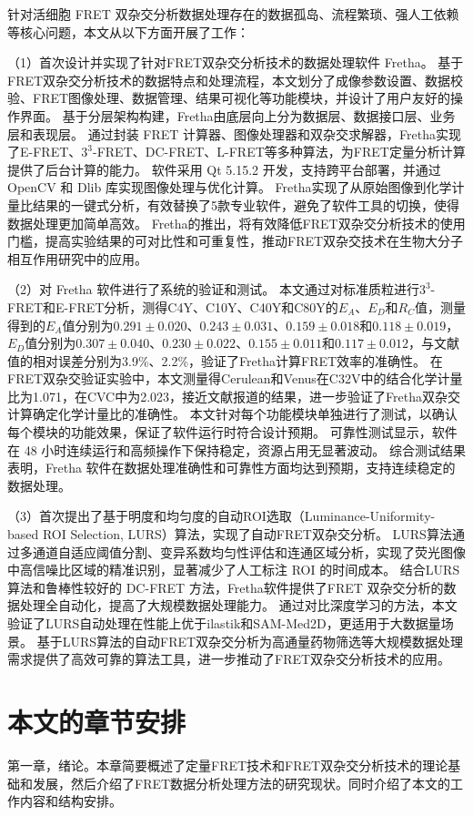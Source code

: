 针对活细胞 FRET 双杂交分析数据处理存在的数据孤岛、流程繁琐、强人工依赖等核心问题，本文从以下方面开展了工作：

（1）首次设计并实现了针对FRET双杂交分析技术的数据处理软件 Fretha。
基于FRET双杂交分析技术的数据特点和处理流程，本文划分了成像参数设置、数据校验、FRET图像处理、数据管理、结果可视化等功能模块，并设计了用户友好的操作界面。
基于分层架构构建，Fretha由底层向上分为数据层、数据接口层、业务层和表现层。
通过封装 FRET 计算器、图像处理器和双杂交求解器，Fretha实现了E-FRET、$3^3$-FRET、DC-FRET、L-FRET等多种算法，为FRET定量分析计算提供了后台计算的能力。
软件采用 Qt 5.15.2 开发，支持跨平台部署，并通过 OpenCV 和 Dlib 库实现图像处理与优化计算。
Fretha实现了从原始图像到化学计量比结果的一键式分析，有效替换了5款专业软件，避免了软件工具的切换，使得数据处理更加简单高效。
Fretha的推出，将有效降低FRET双杂交分析技术的使用门槛，提高实验结果的可对比性和可重复性，推动FRET双杂交技术在生物大分子相互作用研究中的应用。

（2）对 Fretha 软件进行了系统的验证和测试。
本文通过对标准质粒进行$3^3$-FRET和E-FRET分析，测得C4Y、C10Y、C40Y和C80Y的$E_A$、$E_D$和$R_C$值，测量得到的$E_{A}$值分别为$0.291\pm0.020$、$0.243\pm0.031$、$0.159\pm0.018$和$0.118\pm0.019$，$E_{D}$值分别为$0.307\pm0.040$、$0.230\pm0.022$、$0.155\pm0.011$和$0.117\pm0.012$，与文献值的相对误差分别为3.9\%、2.2\%，验证了Fretha计算FRET效率的准确性。
在FRET双杂交验证实验中，本文测量得Cerulean和Venus在C32V中的结合化学计量比为1.071，在CVC中为2.023，接近文献报道的结果，进一步验证了Fretha双杂交计算确定化学计量比的准确性。
本文针对每个功能模块单独进行了测试，以确认每个模块的功能效果，保证了软件运行时符合设计预期。
可靠性测试显示，软件在 48 小时连续运行和高频操作下保持稳定，资源占用无显著波动。
综合测试结果表明，Fretha 软件在数据处理准确性和可靠性方面均达到预期，支持连续稳定的数据处理。

（3）首次提出了基于明度和均匀度的自动ROI选取（Luminance-Uniformity-based ROI Selection, LURS）算法，实现了自动FRET双杂交分析。
LURS算法通过多通道自适应阈值分割、变异系数均匀性评估和连通区域分析，实现了荧光图像中高信噪比区域的精准识别，显著减少了人工标注 ROI 的时间成本。
结合LURS算法和鲁棒性较好的 DC-FRET 方法，Fretha软件提供了FRET 双杂交分析的数据处理全自动化，提高了大规模数据处理能力。
通过对比深度学习的方法，本文验证了LURS自动处理在性能上优于ilastik和SAM-Med2D，更适用于大数据量场景。
基于LURS算法的自动FRET双杂交分析为高通量药物筛选等大规模数据处理需求提供了高效可靠的算法工具，进一步推动了FRET双杂交分析技术的应用。

\section{本文的章节安排}
第一章，绪论。本章简要概述了定量FRET技术和FRET双杂交分析技术的理论基础和发展，然后介绍了FRET数据分析处理方法的研究现状。同时介绍了本文的工作内容和结构安排。


